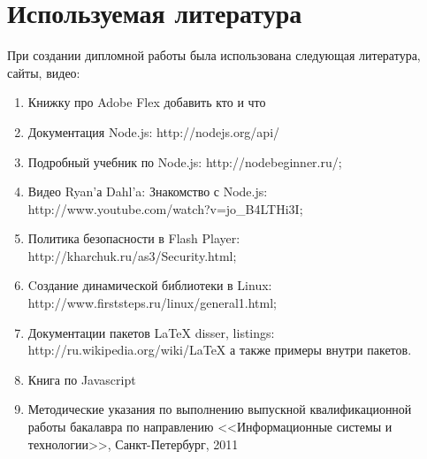 \chapter{Используемая литература}
При создании дипломной работы была использована следующая литература, сайты, видео:

\begin{enumerate}
  \item  Книжку про Adobe Flex добавить кто и что
  \item  Документация Node.js: http://nodejs.org/api/
  \item Подробный учебник по Node.js: http://nodebeginner.ru/;
  \item Видео Ryan'а Dahl'a: Знакомство с Node.js: \\
http://www.youtube.com/watch?v=jo\_B4LTHi3I;
  \item Политика безопасности в Flash Player:\\ http://kharchuk.ru/as3/Security.html;
  \item Cоздание динамической библиотеки в Linux:\\ http://www.firststeps.ru/linux/general1.html;
  \item Документации пакетов LaTeX disser, listings:\\ http://ru.wikipedia.org/wiki/LaTeX а также примеры внутри пакетов.
  \item Книга по Javascript
  \item Методические указания по выполнению выпускной квалификационной работы бакалавра по направлению <<Информационные системы  и технологии>>, Санкт-Петербург, 2011 
\end{enumerate}